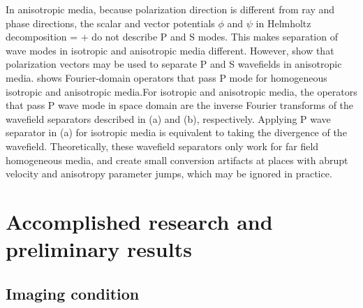 In anisotropic media, because polarization direction is different from ray and phase directions, the scalar and vector potentials $\phi$ and  $\psi$ in Helmholtz decomposition 
\beq \label{eqn:helmholtz}
\uu = \GRAD{\phi} + \CURL{\mathbf \psi} 
\eeq
do not describe P and S modes. This makes separation of wave modes in isotropic and anisotropic media different. However, \cite{GEO55-07-09140919} show that polarization vectors may be used to separate P and S wavefields in anisotropic media.  shows Fourier-domain operators that pass P mode for homogeneous isotropic and anisotropic media.For isotropic and anisotropic media, the operators that pass P wave mode in space domain are the inverse Fourier transforms of the wavefield separators described in (a) and (b), respectively. Applying P wave separator in (a) for isotropic media is equivalent to taking the divergence of the wavefield. Theoretically, these wavefield separators only work for far field homogeneous media, and create small conversion artifacts at places with abrupt velocity and anisotropy parameter jumps, which may be ignored in practice. 





%
\section{Accomplished research and preliminary results}

\subsection{Imaging condition}



